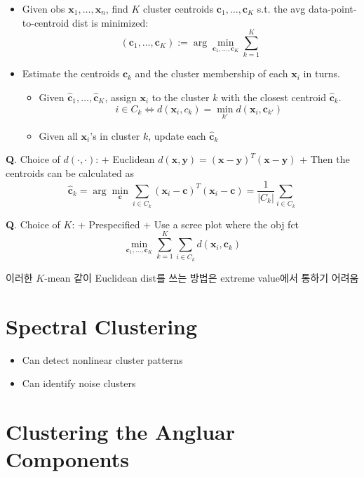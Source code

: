 \documentclass[
  letterpaper,
  DIV=11,
  numbers=noendperiod]{scrreprt}
\providecommand{\tightlist}{%
  \setlength{\itemsep}{0pt}\setlength{\parskip}{0pt}}\usepackage{longtable,booktabs,array}
\theoremstyle{plain}
\theoremstyle{definition}
\theoremstyle{definition}
\theoremstyle{plain}
\theoremstyle{plain}
\theoremstyle{remark}
\begin{document}
\begin{itemize}
\item
  Given obs \(\pmb{x}_1, \ldots, \pmb{x}_n\), find \(K\) cluster
  centroids \(\pmb{c}_1, \ldots, \pmb{c}_K\) s.t. the avg
  data-point-to-centroid dist is minimized: \[
  (\pmb{c}_1, \ldots, \pmb{c}_K) := \arg\min_{\pmb{c}_1, \ldots, \pmb{c}_K} \sum_{k=1}^K 
  \]
\item
  Estimate the centroids \(\pmb{c}_k\) and the cluster membership of
  each \(\pmb{x}_i\) in turns.

  \begin{itemize}
  \tightlist
  \item
    Given \(\hat{\pmb{c}}_1, \ldots, \hat{\pmb{c}}_K\), assign
    \(\pmb{x}_i\) to the cluster \(k\) with the closest centroid
    \(\hat{\pmb{c}}_k\). \[
    i \in C_k \Longleftrightarrow d(\pmb{x}_i, c_k) = \min_{k'}d(\pmb{x}_i, \pmb{c}_{k'})
    \]
  \item
    Given all \(\pmb{x}_i\)'s in cluster \(k\), update each
    \(\hat{\pmb{c}}_k\)
  \end{itemize}
\end{itemize}

\textbf{Q}. Choice of \(d(\cdot, \cdot)\): + Euclidean
\(d(\pmb{x}, \pmb{y}) = (\pmb{x}- \pmb{y})^T(\pmb{x}- \pmb{y})\) + Then
the centroids can be calculated as \[
  \hat{\pmb{c}}_k = \arg\min_{\pmb{c}} \sum_{i\in C_k}(\pmb{x}_i - \pmb{c})^T(\pmb{x}_i - \pmb{c}) = \frac{1}{|C_k|} \sum_{i\in C_k}
  \]

\textbf{Q}. Choice of \(K\): + Prespecified + Use a scree plot where the
obj fct \[
  \min_{\pmb{c}_1, \ldots, \pmb{c}_K} \sum_{k=1}^K \sum_{i \in C_k} d(\pmb{x}_i , \pmb{c}_k)
  \]

이러한 \(K\)-mean 같이 Euclidean dist를 쓰는 방법은 extreme value에서
통하기 어려움

\section{Spectral Clustering}\label{spectral-clustering}

\begin{itemize}
\item
  Can detect nonlinear cluster patterns
\item
  Can identify noise clusters
\end{itemize}

\section{Clustering the Angluar
Components}\label{clustering-the-angluar-components}
\end{document}
